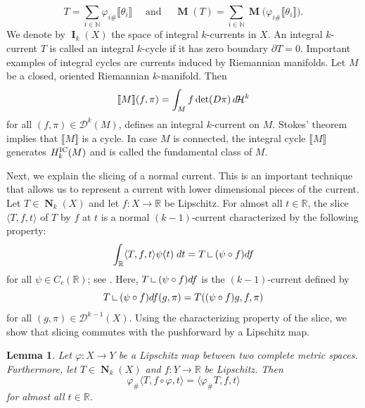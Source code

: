\documentclass{amsart}
\newtheorem{lemma}[theorem]{Lemma}
\numberwithin{equation}{section}
\newcommand{\R}{\mathbb{R}}
\newcommand{\N}{\mathbb{N}}
\newcommand{\Ha}{\mathcal{H}}
\newcommand{\on}{\:\mbox{\rule{0.1ex}{1.2ex}\rule{1.1ex}{0.1ex}}\:}
\DeclareMathOperator{\bI}{\mathbf{I}}
\DeclareMathOperator{\bN}{\mathbf{N}}
\DeclareMathOperator{\mass}{\mathbf{M}}
\newcommand{\bb}[1]{\llbracket #1\rrbracket}
\begin{document}
        $$T=\sum_{i\in \N} \varphi_{i\#}\bb{\theta_i} \quad \text{ and } \quad \mass(T)=\sum_{i\in \N} \mass\big(\varphi_{i\#}\bb{\theta_i}\big).$$
        We denote by $\bI_k(X)$ the space of integral $k$-currents in $X$. An integral $k$-current $T$ is called an integral $k$-cycle if it has zero boundary $\partial T = 0$. Important examples of integral cycles are currents induced by Riemannian manifolds. Let $M$ be a closed, oriented Riemannian $k$-manifold. Then 
        \[
        \bb{M}(f,\pi) = \int_Mf\det(D\pi)\,d\hspace{-0.14em}\Ha^k
        \]
        for all \((f, \pi)\in \mathcal{D}^k(M)\), defines an integral $k$-current on $M$. Stokes' theorem implies that $\bb{M}$ is a cycle. In case $M$ is connected, the integral cycle $\bb{M}$ generates $H_k^\textup{IC}(M)$ and is called the fundamental class of $M$.


        \medskip


        Next, we explain the slicing of a normal current. This is an important technique that allows us to represent a current with lower dimensional pieces of the current. Let $T \in \bN_k(X)$ and let $f\colon X \to \R$ be Lipschitz. For almost all $t \in \R$, the slice $\langle T, f, t\rangle$ of $T$ by $f$ at $t$ is a normal $(k-1)$-current characterized by the following property:
        \begin{equation}\label{eq: charact-property-slice}
            \int_\R \langle T, f, t\rangle \psi(t) \; dt = T\on(\psi \circ f)df
        \end{equation}
        for all $\psi \in C_c(\R)$; see \cite[Theorem 5.6]{ambrosio-kirchheim-2000}. Here, $ T\on(\psi \circ f)df$ is the $(k-1)$-current defined by 
        $$T\on(\psi \circ f)df(g,\pi) = T((\psi\circ f) g, f, \pi)$$
        for all $(g,\pi) \in \mathcal{D}^{k-1}(X)$. Using the characterizing property of the slice, we show that slicing commutes with the pushforward by a Lipschitz map. 
        
        
        \begin{lemma}\label{lemma: pushfw-slice-is-slice-phsfwd-normal}
            Let $\varphi \colon X \to Y$ be a Lipschitz map between two complete metric spaces. Furthermore, let $T \in \bN_k(X)$ and $f\colon Y\to\R$ be Lipschitz. Then 
            $$\varphi_\#\langle T, f\circ \varphi, t \rangle = \langle \varphi_\# T, f, t \rangle$$
            for almost all $t \in \R$.
        \end{lemma}
    
\end{document}
